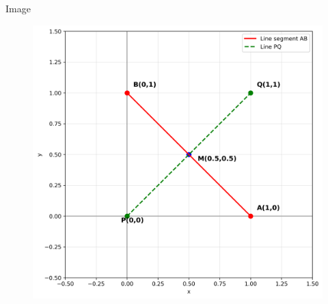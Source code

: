 \documentclass{beamer}
\begin{document}
\begin{frame}{Image}
\begin{figure}
   \centering
    \includegraphics[width=\columnwidth, height=0.8\textheight, keepaspectratio]{figs/fig1.png}
    \label{fig:Beamer/figs/fig1.png}
\end{figure}
\end{frame}
\end{document}
